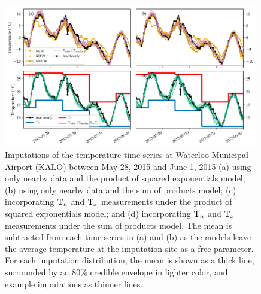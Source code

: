 \documentclass[12pt]{article}
\begin{document}
\label{sec:predict_nearby}
\begin{figure}[tb]
\centering
\includegraphics[width=0.99\textwidth]{../figures/imputations_2x2.pdf}
\caption{\label{fig:imputations_2x2}Imputations of the temperature time series at Waterloo Municipal Airport (KALO) between May 28, 2015 and June 1, 2015 (a) using only nearby data and the product of squared exponentials model; (b) using only nearby data and the sum of products model; (c) incorporating \(\mathrm{T}_{n}\) and \(\mathrm{T}_{x}\) measurements under the product of squared exponentials model; and (d) incorporating \(\mathrm{T}_{n}\) and \(\mathrm{T}_{x}\) measurements under the sum of products model. The mean is subtracted from each time series in (a) and (b) as the models leave the average temperature at the imputation site as a free parameter. For each imputation distribution, the mean is shown as a thick line, surrounded by an 80\% credible envelope in lighter color, and example imputations as thinner lines.}
\end{figure}
\end{document}
